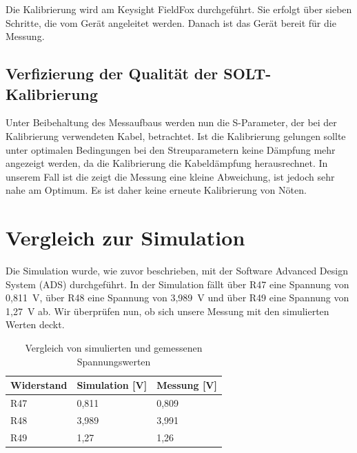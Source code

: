 Die Kalibrierung wird am Keysight FieldFox durchgeführt. Sie erfolgt über sieben Schritte, die vom Gerät angeleitet werden. Danach ist das Gerät bereit für die Messung.
\subsection{Verfizierung der Qualität der SOLT-Kalibrierung}
Unter Beibehaltung des Messaufbaus werden nun die S-Parameter, der bei der Kalibrierung verwendeten Kabel, betrachtet. Ist die Kalibrierung gelungen sollte unter optimalen Bedingungen bei den Streuparametern keine Dämpfung mehr angezeigt werden, da die Kalibrierung die Kabeldämpfung herausrechnet. In unserem Fall ist die zeigt die Messung eine kleine Abweichung, ist jedoch sehr nahe am Optimum. Es ist daher keine erneute Kalibrierung von Nöten.


\section{Vergleich zur Simulation}
Die Simulation wurde, wie zuvor beschrieben, mit der Software Advanced Design System (ADS) durchgeführt. In der Simulation fällt über R47 eine Spannung von 0,811~V, über R48 eine Spannung von 3,989~V und über R49 eine Spannung von 1,27~V ab. Wir überprüfen nun, ob sich unsere Messung mit den simulierten Werten deckt.

\begin{table}[h]
    \centering
    \begin{tabular}{|l|l|l|}
        \hline
        \textbf{Widerstand} & \textbf{Simulation [V]} & \textbf{Messung [V]} \\
        \hline
        R47 & 0{,}811 & 0{,}809 \\
        \hline
        R48 & 3{,}989 & 3{,}991 \\
        \hline
        R49 & 1{,}27  & 1{,}26 \\
        \hline
    \end{tabular}
    \caption{Vergleich von simulierten und gemessenen Spannungswerten}
\end{table}

\clearpage
